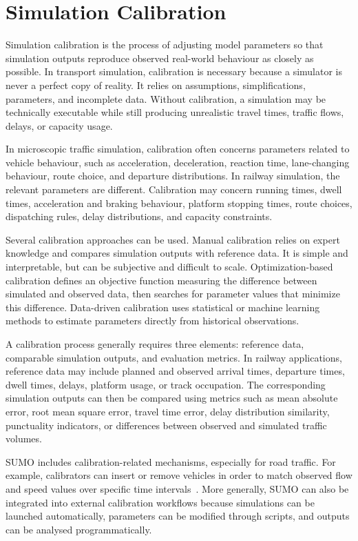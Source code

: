 \section{Simulation Calibration}
Simulation calibration is the process of adjusting model parameters so that simulation outputs reproduce observed 
real-world behaviour as closely as possible. In transport simulation, calibration is necessary because a simulator is 
never a perfect copy of reality. It relies on assumptions, simplifications, parameters, and incomplete data. Without 
calibration, a simulation may be technically executable while still producing unrealistic travel times, traffic flows, 
delays, or capacity usage.

In microscopic traffic simulation, calibration often concerns parameters related to vehicle behaviour, such as 
acceleration, deceleration, reaction time, lane-changing behaviour, route choice, and departure distributions. In railway 
simulation, the relevant parameters are different. Calibration may concern running times, dwell times, acceleration and 
braking behaviour, platform stopping times, route choices, dispatching rules, delay distributions, and capacity constraints.

Several calibration approaches can be used. Manual calibration relies on expert knowledge and compares simulation outputs 
with reference data. It is simple and interpretable, but can be subjective and difficult to scale. Optimization-based 
calibration defines an objective function measuring the difference between simulated and observed data, then searches for 
parameter values that minimize this difference. Data-driven calibration uses statistical or machine learning methods to 
estimate parameters directly from historical observations.

A calibration process generally requires three elements: reference data, comparable simulation outputs, and evaluation 
metrics. In railway applications, reference data may include planned and observed arrival times, departure times, dwell 
times, delays, platform usage, or track occupation. The corresponding simulation outputs can then be compared using metrics 
such as mean absolute error, root mean square error, travel time error, delay distribution similarity, punctuality 
indicators, or differences between observed and simulated traffic volumes.

SUMO includes calibration-related mechanisms, especially for road traffic. For example, calibrators can insert or remove 
vehicles in order to match observed flow and speed values over specific time intervals~\cite{sumo_calibrator}. More 
generally, SUMO can also be integrated into external calibration workflows because simulations can be launched 
automatically, parameters can be modified through scripts, and outputs can be analysed programmatically.


